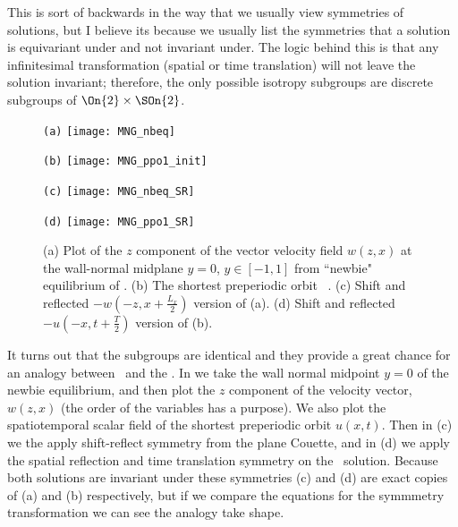 This is sort of backwards in the way that we usually view symmetries of solutions, but I believe its because
we usually list the symmetries that a solution is equivariant under and not invariant under.
The logic behind this is that any infinitesimal transformation
(spatial or time translation) will not leave the solution invariant; therefore,
the only possible isotropy subgroups are discrete subgroups of $\On{2} \times \SOn{2}$.


\begin{figure}
\begin{minipage}[height=.32\textheight]{.5\textwidth}
\centering \small{\texttt{(a)}}
\texttt{[image: MNG\_nbeq]}
\end{minipage}
\begin{minipage}[height=.32\textheight]{.5\textwidth}
\centering \small{\texttt{(b)}}
\texttt{[image: MNG\_ppo1\_init]}
\end{minipage}
\begin{minipage}[height=.32\textheight]{.5\textwidth}
\centering \small{\texttt{(c)}}
\texttt{[image: MNG\_nbeq\_SR]}
\end{minipage}
\begin{minipage}[height=.32\textheight]{.5\textwidth}
\centering \small{\texttt{(d)}}
\texttt{[image: MNG\_ppo1\_SR]}
\end{minipage}
\caption{ \label{fig:MNG_shiftreflect}
(a) Plot of  the $z$ component of the vector
velocity field $w(z,x)$ at the wall-normal midplane $y=0$, $y \in [-1,1]$
from ``newbie" equilibrium of \pCf.
(b) The shortest preperiodic orbit \KS\ . %
(c) Shift and reflected $-w(-z,x+\frac{L_x}{2})$ version of (a).
(d) Shift and reflected $-u(-x,t+\frac{T}{2})$ version of (b).
}
\end{figure}

It turns out that the subgroups are identical and they provide a great chance for
an analogy between \pCf\ and the \KSe. In 
we take the wall normal
midpoint $y=0$ of the newbie equilibrium, and then plot the $z$ component of the
velocity vector, $w(z,x)$ (the order of the variables has a purpose). We also
plot the spatiotemporal scalar field of the shortest preperiodic orbit $u(x,t)$.
Then in (c) we the apply shift-reflect symmetry from the plane Couette,
and in (d) we apply the spatial reflection and time translation symmetry on
the \KS\ solution.
Because both solutions are invariant under these symmetries (c) and (d) are
exact copies of (a) and (b) respectively, but if we compare the equations for the
symmmetry transformation we can see the analogy take shape.

